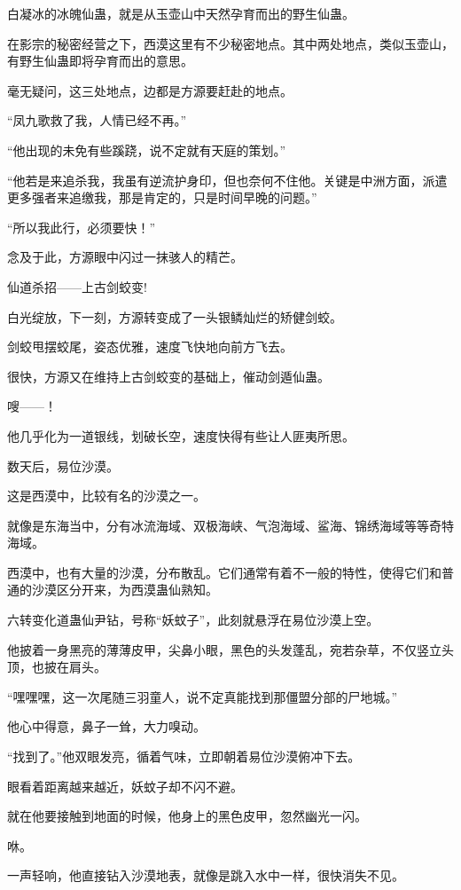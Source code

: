 \begin{this_body}
白凝冰的冰魄仙蛊，就是从玉壶山中天然孕育而出的野生仙蛊。

在影宗的秘密经营之下，西漠这里有不少秘密地点。其中两处地点，类似玉壶山，有野生仙蛊即将孕育而出的意思。

毫无疑问，这三处地点，边都是方源要赶赴的地点。

“凤九歌救了我，人情已经不再。”

“他出现的未免有些蹊跷，说不定就有天庭的策划。”

“他若是来追杀我，我虽有逆流护身印，但也奈何不住他。关键是中洲方面，派遣更多强者来追缴我，那是肯定的，只是时间早晚的问题。”

“所以我此行，必须要快！”

念及于此，方源眼中闪过一抹骇人的精芒。

仙道杀招——上古剑蛟变!

白光绽放，下一刻，方源转变成了一头银鳞灿烂的矫健剑蛟。

剑蛟甩摆蛟尾，姿态优雅，速度飞快地向前方飞去。

很快，方源又在维持上古剑蛟变的基础上，催动剑遁仙蛊。

嗖——！

他几乎化为一道银线，划破长空，速度快得有些让人匪夷所思。

数天后，易位沙漠。

这是西漠中，比较有名的沙漠之一。

就像是东海当中，分有冰流海域、双极海峡、气泡海域、鲨海、锦绣海域等等奇特海域。

西漠中，也有大量的沙漠，分布散乱。它们通常有着不一般的特性，使得它们和普通的沙漠区分开来，为西漠蛊仙熟知。

六转变化道蛊仙尹钻，号称“妖蚊子”，此刻就悬浮在易位沙漠上空。

他披着一身黑亮的薄薄皮甲，尖鼻小眼，黑色的头发蓬乱，宛若杂草，不仅竖立头顶，也披在肩头。

“嘿嘿嘿，这一次尾随三羽童人，说不定真能找到那僵盟分部的尸地城。”

他心中得意，鼻子一耸，大力嗅动。

“找到了。”他双眼发亮，循着气味，立即朝着易位沙漠俯冲下去。

眼看着距离越来越近，妖蚊子却不闪不避。

就在他要接触到地面的时候，他身上的黑色皮甲，忽然幽光一闪。

咻。

一声轻响，他直接钻入沙漠地表，就像是跳入水中一样，很快消失不见。


\end{this_body}
